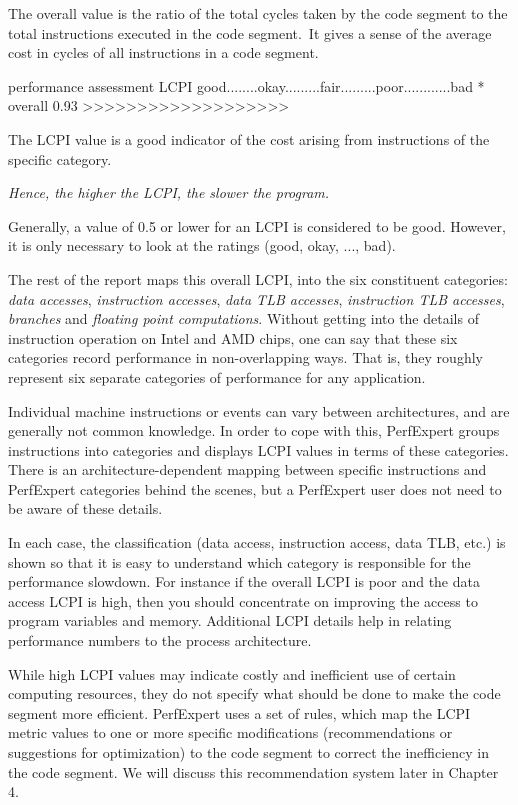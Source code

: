 The overall value is the ratio of the total cycles taken by the code segment to the total instructions executed in the code segment.~It gives a sense of the average cost in cycles of all instructions in a code segment.

\begin{prompt}
performance assessment  LCPI good........okay.........fair.........poor............bad
* overall               0.93 >>>>>>>>>>>>>>>>>>>
\end{prompt}

The LCPI value is a good indicator of the cost arising from instructions of the specific category.

\emph{Hence, the higher the LCPI, the slower the program.}

Generally, a value of 0.5 or lower for an LCPI is considered to be good. However, it is only necessary to look at the ratings (good, okay, ..., bad).

The rest of the report maps this overall LCPI, into the six constituent categories: \emph{data accesses}, \emph{instruction accesses}, \emph{data TLB accesses}, \emph{instruction TLB accesses}, \emph{branches} and \emph{floating point computations}. Without getting into the details of instruction operation on Intel and AMD chips, one can say that these six categories record performance in non-overlapping ways. That is, they roughly represent six separate categories of performance for any application.

Individual machine instructions or events can vary between architectures, and are generally not common knowledge. In order to cope with this, PerfExpert groups instructions into categories and displays LCPI values in terms of these categories. There is an architecture-dependent mapping between specific instructions and PerfExpert categories behind the scenes, but a PerfExpert user does not need to be aware of these details.


In each case, the classification (data access, instruction access, data TLB, etc.) is shown so that it is easy to understand which category is responsible for the performance slowdown. For instance if the overall LCPI is poor and the data access LCPI is high, then you should concentrate on improving the access to program variables and memory. Additional LCPI details help in relating performance numbers to the process architecture.

While high LCPI values may indicate costly and inefficient use of certain computing resources, they do not specify what should be done to make the code segment more efficient. PerfExpert uses a set of rules, which map the LCPI metric values to one or more specific modifications (recommendations or suggestions for optimization) to the code segment to correct the inefficiency in the code segment. We will discuss this recommendation system later in Chapter 4.

